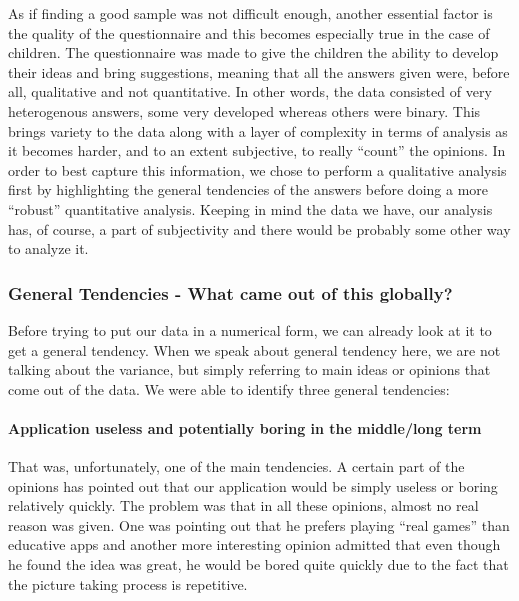 \documentclass[12pt]{scrartcl}
\begin{document}
		As if finding a good sample was not difficult enough, another essential factor is the quality of the questionnaire and this becomes especially true in the case of children. The questionnaire was made to give the children the ability to develop their ideas and bring suggestions, meaning that all the answers given were, before all, qualitative and not quantitative. In other words, the data consisted of very heterogenous answers, some very developed whereas others were binary. This brings variety to the data along with a layer of complexity in terms of analysis as it becomes harder, and to an extent subjective, to really ``count'' the opinions. In order to best capture this information, we chose to perform a qualitative analysis first by highlighting the general tendencies of the answers before doing a more ``robust'' quantitative analysis. Keeping in mind the data we have, our analysis has, of course, a part of subjectivity and there would be probably some other way to analyze it. 
		
		\subsubsection*{General Tendencies - What came out of this globally?}

			Before trying to put our data in a numerical form, we can already look at it to get a general tendency. When we speak about general tendency here, we are not talking about the variance, but simply referring to main ideas or opinions that come out of the data. We were able to identify three general tendencies:

				\paragraph{Application useless and potentially boring in the middle/long term} 
					That was, unfortunately, one of the main tendencies. A certain part of the opinions has pointed out that our application would be simply useless or boring relatively quickly. The problem was that in all these opinions, almost no real reason was given. One was pointing out that he prefers playing ``real games'' than educative apps and another more interesting opinion admitted that even though he found the idea was great, he would be bored quite quickly due to the fact that the picture taking process is repetitive.
\end{document}

